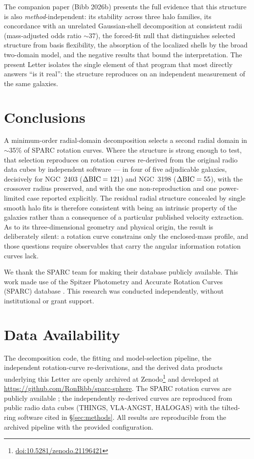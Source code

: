 \documentclass[linenumbers,twocolumn]{aastex701}
\newcommand{\dbic}{\Delta{\rm BIC}}
\providecommand{\doi}[1]{\href{https://doi.org/#1}{doi:#1}}
\begin{document}
The companion paper (Bibb 2026b) presents the full evidence that this structure is
also \emph{method}-independent: its stability across three halo families, its
concordance with an unrelated Gaussian-shell decomposition at consistent radii
(mass-adjusted odds ratio $\sim$37), the forced-fit null that distinguishes
selected structure from basis flexibility, the absorption of the localized shells
by the broad two-domain model, and the negative results that bound the
interpretation. The present Letter isolates the single element of that program
that most directly answers ``is it real'': the structure reproduces on an
independent measurement of the same galaxies.

\section{Conclusions} \label{sec:conclusions}

A minimum-order radial-domain decomposition selects a second radial domain in
$\sim$35\% of SPARC rotation curves. Where the structure is strong enough to test,
that selection reproduces on rotation curves re-derived from the original radio
data cubes by independent software --- in four of five adjudicable galaxies,
decisively for NGC~2403 ($\dbic = 121$) and NGC~3198 ($\dbic = 55$), with the
crossover radius preserved, and with the one non-reproduction and one
power-limited case reported explicitly. The residual radial structure concealed by
single smooth halo fits is therefore consistent with being an intrinsic property of the
galaxies rather than a consequence of a particular published velocity extraction. As to its three-dimensional
geometry and physical origin, the result is deliberately silent: a rotation curve
constrains only the enclosed-mass profile, and those questions require observables
that carry the angular information rotation curves lack.

\begin{acknowledgments}
We thank the SPARC team for making their database publicly available. This work
made use of the Spitzer Photometry and Accurate Rotation Curves (SPARC) database
\citep{Lelli2016}. This research was conducted independently, without
institutional or grant support.
\end{acknowledgments}

\section*{Data Availability} \label{sec:dataavail}
The decomposition code, the fitting and model-selection pipeline, the independent
rotation-curve re-derivations, and the derived data products underlying this Letter
are openly archived at Zenodo\footnote{\doi{10.5281/zenodo.21196421}} and developed at
\url{https://github.com/RonBibb/sparc-sphere}. The SPARC rotation curves are publicly
available \citep{Lelli2016}; the independently re-derived curves are reproduced from
public radio data cubes (THINGS, VLA-ANGST, HALOGAS) with the tilted-ring software
cited in \S\ref{sec:methods}. All results are reproducible from the archived
pipeline with the provided configuration.
\end{document}
